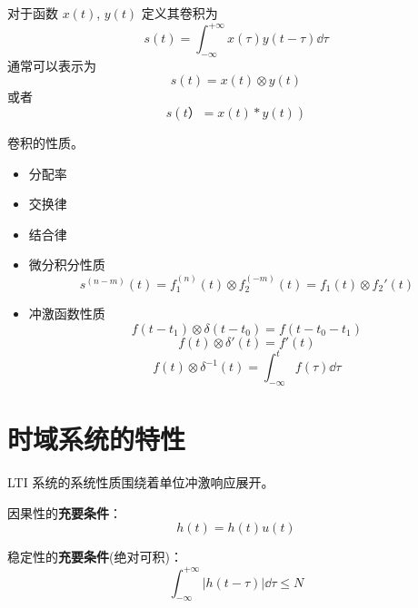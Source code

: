 \documentclass[cn,11pt,chinese,black,simple]{../elegantbook}
\begin{document}
\begin{definition}[卷积]
  对于函数 \(x(t)\), \(y(t)\) 定义其卷积为
  \[s(t) = \int_{-\infty}^{+\infty} x(\tau) y(t-\tau) \dd{\tau}\]
  通常可以表示为
  \[s(t) = x(t) \otimes y(t)\]
  或者
  \[s(t） = x(t) * y(t))\]
\end{definition}

卷积的性质。
\begin{itemize}
  \item 分配率
  \item 交换律
  \item 结合律
  \item 微分积分性质 \[s^{(n-m)}(t) = f_1^{(n)}(t) \otimes f_2^{(-m)}(t) = f_1(t) \otimes f_2'(t)\]
  \item 冲激函数性质 \[f(t-t_1) \otimes \delta(t-t_0) = f(t-t_0-t_1)\] 
        \[f(t) \otimes \delta'(t) = f'(t)\] 
        \[f(t) \otimes \delta^{-1}(t) = \int_{-\infty}^t f(\tau)\dd{\tau}\]
\end{itemize}

\section{时域系统的特性}

LTI 系统的系统性质围绕着单位冲激响应展开。

因果性的\textbf{充要条件}： \[h(t) = h(t) u(t)\]

稳定性的\textbf{充要条件}(绝对可积)： \[\int_{-\infty}^{+\infty} |h(t-\tau)| \dd{\tau} \leq N \] 



\ifx\mainclass\undefined
\end{document}
